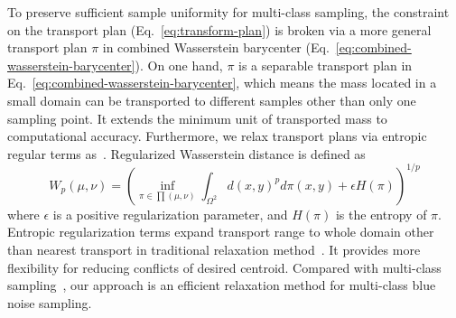 To preserve sufficient sample uniformity for multi-class sampling,
the constraint on the transport plan (Eq.~\ref{eq:transform-plan})
is broken via a more general transport plan $\pi$ in combined Wasserstein barycenter (Eq.~\ref{eq:combined-wasserstein-barycenter}).
On one hand,
$\pi$ is a separable transport plan in Eq.~\ref{eq:combined-wasserstein-barycenter},
which means the mass located in a small domain can be transported to different samples other than only one sampling point.
It extends the minimum unit of transported mass to computational accuracy.
Furthermore,
we relax transport plans via entropic regular terms as~\cite{cuturi:2013:sinkhorn}.
Regularized Wasserstein distance is defined as
\begin{equation}\label{eq:regulate-wasserstein-distance}
 W_p(\mu,\nu)=\left(\inf\limits_{\pi\in\prod(\mu,\nu)}\int_{\Omega^2}d(x,y)^pd\pi(x,y)+\epsilon H(\pi)\right )^{1/p}
\end{equation}
where $\epsilon$ is a positive regularization parameter,
and $H(\pi)$ is the entropy of $\pi$.
Entropic regularization terms expand transport range to whole domain other than nearest transport in traditional relaxation method~\cite{balzer:2009:capacity}.
It provides more flexibility for reducing conflicts of desired centroid.
Compared with multi-class sampling~\cite{wei:2010:multi},
our approach is an efficient relaxation method for multi-class blue noise sampling.






